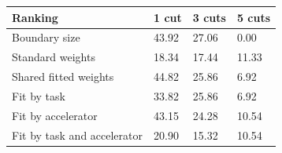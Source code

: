 \begin{tabular}{@{}llll@{}}
\toprule
Ranking & 1 cut & 3 cuts & 5 cuts \\
\midrule
Boundary size & 43.92 & 27.06 & 0.00 \\
Standard weights & 18.34 & 17.44 & 11.33 \\
Shared fitted weights & 44.82 & 25.86 & 6.92 \\
Fit by task & 33.82 & 25.86 & 6.92 \\
Fit by accelerator & 43.15 & 24.28 & 10.54 \\
Fit by task and accelerator & 20.90 & 15.32 & 10.54 \\
\bottomrule
\end{tabular}
